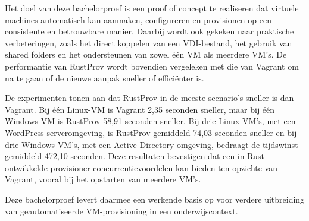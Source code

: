Het doel van deze bachelorproef is een proof of concept te realiseren dat virtuele machines automatisch kan aanmaken, configureren en provisionen op een consistente en betrouwbare manier. Daarbij wordt ook gekeken naar praktische verbeteringen, zoals het direct koppelen van een VDI-bestand, het gebruik van shared folders en het ondersteunen van zowel één VM als meerdere VM's. De performantie van RustProv wordt bovendien vergeleken met die van Vagrant om na te gaan of de nieuwe aanpak sneller of efficiënter is.

De experimenten tonen aan dat RustProv in de meeste scenario's sneller is dan Vagrant. Bij één Linux-VM is Vagrant 2,35 seconden sneller, maar bij één Windows-VM is RustProv 58,91 seconden sneller. Bij drie Linux-VM's, met een WordPress-serveromgeving, is RustProv gemiddeld 74,03 seconden sneller en bij drie Windows-VM's, met een Active Directory-omgeving, bedraagt de tijdswinst gemiddeld 472,10 seconden. Deze resultaten bevestigen dat een in Rust ontwikkelde provisioner concurrentievoordelen kan bieden ten opzichte van Vagrant, vooral bij het opstarten van meerdere VM's.

Deze bachelorproef levert daarmee een werkende basis op voor verdere uitbreiding van geautomatiseerde VM-provisioning in een onderwijscontext.
